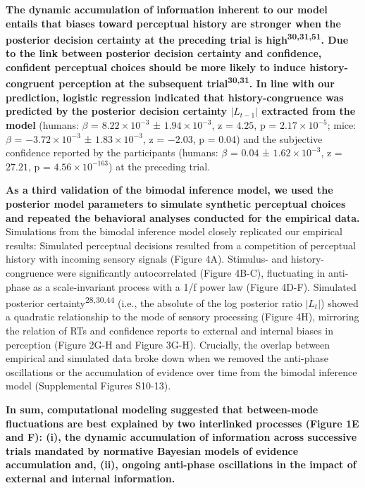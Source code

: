 \documentclass[
]{article}
\begin{document}
\textbf{The dynamic accumulation of information inherent to our model
entails that biases toward perceptual history are stronger when the
posterior decision certainty at the preceding trial is
high\textsuperscript{30,31,51}. Due to the link between posterior
decision certainty and confidence, confident perceptual choices should
be more likely to induce history-congruent perception at the subsequent
trial\textsuperscript{30,31}. In line with our prediction, logistic
regression indicated that history-congruence was predicted by the
posterior decision certainty \(|L_{t-1}|\) extracted from the model}
(humans: \(\beta\) = \(\ensuremath{8.22\times 10^{-3}}\) ±
\(\ensuremath{1.94\times 10^{-3}}\), z = \(4.25\), p =
\(\ensuremath{2.17\times 10^{-5}}\); mice: \(\beta\) =
\(\ensuremath{-3.72\times 10^{-3}}\) ±
\(\ensuremath{1.83\times 10^{-3}}\), z = \(-2.03\), p = \(0.04\)) and
the subjective confidence reported by the participants (humans:
\(\beta\) = \(0.04\) ± \(\ensuremath{1.62\times 10^{-3}}\), z =
\(27.21\), p = \(\ensuremath{4.56\times 10^{-163}}\)) at the preceding
trial.

\textbf{As a third validation of the bimodal inference model, we used
the posterior model parameters to simulate synthetic perceptual choices
and repeated the behavioral analyses conducted for the empirical data.}
Simulations from the bimodal inference model closely replicated our
empirical results: Simulated perceptual decisions resulted from a
competition of perceptual history with incoming sensory signals (Figure
4A). Stimulus- and history-congruence were significantly autocorrelated
(Figure 4B-C), fluctuating in anti-phase as a scale-invariant process
with a 1/f power law (Figure 4D-F). Simulated posterior
certainty\textsuperscript{28,30,44} (i.e., the absolute of the log
posterior ratio \(|L_t|\)) showed a quadratic relationship to the mode
of sensory processing (Figure 4H), mirroring the relation of RTs and
confidence reports to external and internal biases in perception (Figure
2G-H and Figure 3G-H). Crucially, the overlap between empirical and
simulated data broke down when we removed the anti-phase oscillations or
the accumulation of evidence over time from the bimodal inference model
(Supplemental Figures S10-13).

\textbf{In sum, computational modeling suggested that between-mode
fluctuations are best explained by two interlinked processes (Figure 1E
and F): (i), the dynamic accumulation of information across successive
trials mandated by normative Bayesian models of evidence accumulation
and, (ii), ongoing anti-phase oscillations in the impact of external and
internal information.}
\end{document}
